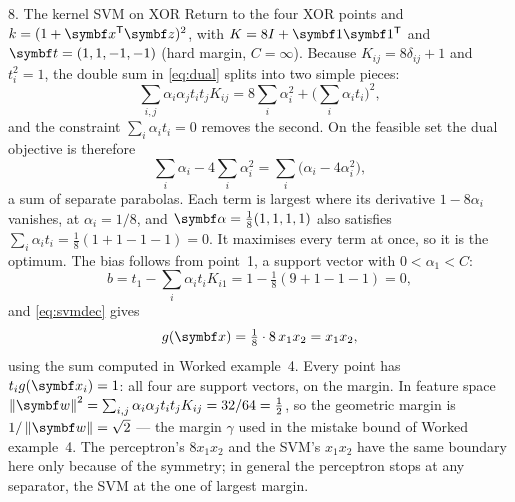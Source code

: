 \documentclass[11pt]{article}
\newcommand{\w}{\vect{w}}
\newcommand{\z}{\vect{z}}
\newcommand{\valpha}{\vect{\alpha}}
\begin{document}
\begin{worked}{8. The kernel SVM on XOR}
Return to the four XOR points and $k = (1 + \x\T\z)^2$, with $K = 8I + \vect{1}\vect{1}\T$ and $\vect{t} = (1, 1, -1,
-1)$ (hard margin, $C = \infty$). Because $K_{ij} = 8\delta_{ij} + 1$ and $t_i^2 = 1$, the double sum in
\eqref{eq:dual} splits into two simple pieces:
\[
  \sum_{i,j}\alpha_i\alpha_jt_it_jK_{ij} = 8\sum_i \alpha_i^2 + \Big(\sum_i \alpha_it_i\Big)^2 ,
\]
and the constraint $\sum_i\alpha_it_i = 0$ removes the second. On the feasible set the dual objective is therefore
\[
  \sum_i \alpha_i - 4\sum_i \alpha_i^2 = \sum_i \big(\alpha_i - 4\alpha_i^2\big) ,
\]
a sum of separate parabolas. Each term is largest where its derivative $1 - 8\alpha_i$ vanishes, at $\alpha_i = 1/8$,
and $\valpha = \frac18(1, 1, 1, 1)$ also satisfies $\sum_i\alpha_it_i = \frac18(1 + 1 - 1 - 1) = 0$. It maximises every
term at once, so it is the optimum. The bias follows from point~1, a support vector with $0 < \alpha_1 < C$:
\[
  b = t_1 - \sum_i \alpha_it_iK_{i1} = 1 - \tfrac18(9 + 1 - 1 - 1) = 0 ,
\]
and \eqref{eq:svmdec} gives
\[
  g(\x) = \tfrac18 \cdot 8\,x_1x_2 = x_1x_2 ,
\]
using the sum computed in Worked example~4. Every point has $t_ig(\x_i) = 1$: all four are support vectors, on the
margin. In feature space $\norm{\w}^2 = \sum_{i,j}\alpha_i\alpha_jt_it_jK_{ij} = 32/64 = \frac12$, so the geometric
margin is $1/\norm{\w} = \sqrt2$ --- the margin $\gamma$ used in the mistake bound of Worked example~4. The perceptron's
$8x_1x_2$ and the SVM's $x_1x_2$ have the same boundary here only because of the symmetry; in general the perceptron
stops at any separator, the SVM at the one of largest margin.
\end{worked}
\end{document}
